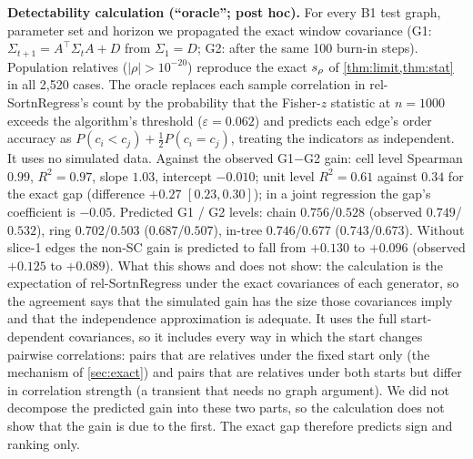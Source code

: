 \textbf{Detectability calculation (``oracle''; post hoc).} For every B1 test graph, parameter set
and horizon we propagated the exact window covariance (G1:
$\Sigma_{t+1}=A^\top\Sigma_tA+D$ from $\Sigma_1=D$; G2: after the same 100
burn-in steps). Population relatives ($|\rho|>10^{-20}$) reproduce the exact
$s_\rho$ of \cref{thm:limit,thm:stat} in all 2{,}520 cases. The oracle replaces
each sample correlation in rel-SortnRegress's count by the probability that
the Fisher-$z$ statistic at $n=1000$ exceeds the algorithm's threshold
($\varepsilon=0.062$) and predicts each edge's order accuracy as
$P(c_i<c_j)+\tfrac12P(c_i=c_j)$, treating the indicators as independent. It uses
no simulated data. Against the observed G1$-$G2 gain: cell level Spearman
$0.99$, $R^2=0.97$, slope $1.03$, intercept $-0.010$; unit level $R^2=0.61$
against $0.34$ for the exact gap (difference $+0.27$ $[0.23,0.30]$); in a joint
regression the gap's coefficient is $-0.05$. Predicted G1 / G2 levels: chain
$0.756$/$0.528$ (observed $0.749$/$0.532$), ring $0.702$/$0.503$ ($0.687$/$0.507$),
in-tree $0.746$/$0.677$ ($0.743$/$0.673$). Without slice-1 edges the non-SC gain
is predicted to fall from $+0.130$ to $+0.096$ (observed $+0.125$ to $+0.089$).
What this shows and does not show: the calculation is the expectation of
rel-SortnRegress under the exact covariances of each generator, so the
agreement says that the simulated gain has the size those covariances imply
and that the independence approximation is adequate. It uses the full
start-dependent covariances, so it includes every way in which the start
changes pairwise correlations: pairs that are relatives under the fixed start
only (the mechanism of \cref{sec:exact}) and pairs that are relatives under
both starts but differ in correlation strength (a transient that needs no
graph argument). We did not decompose the predicted gain into these two
parts, so the calculation does not show that the gain is due to the first.
The exact gap therefore predicts sign and ranking only.

